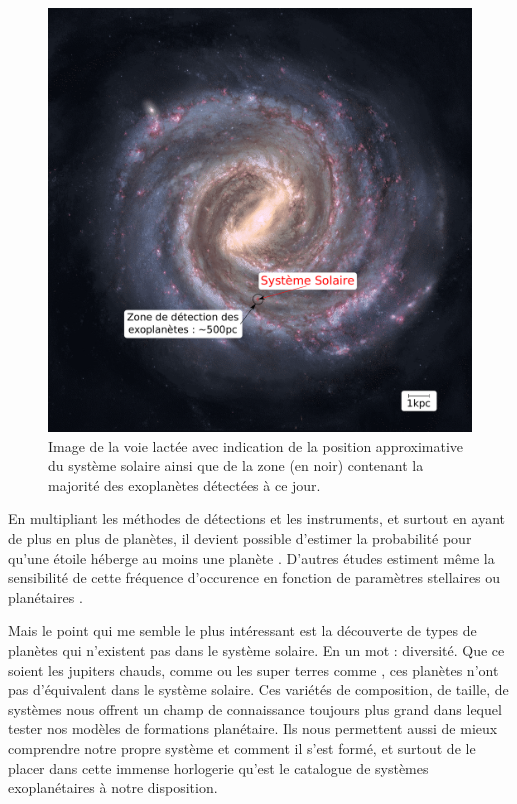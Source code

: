 \begin{figure}[htb]
\centering
\includegraphics[width=0.45\linewidth]{figure/milky_way_exoplanets.pdf}
\caption{Image de la voie lactée avec indication de la position approximative du système solaire ainsi que de la zone (en noir) contenant la majorité des exoplanètes détectées à ce jour.}\label{fig:milky_way_exoplanet}
\end{figure}


En multipliant les méthodes de détections et les instruments, et surtout en ayant de plus en plus de planètes, il devient possible d'estimer la probabilité pour qu'une étoile héberge au moins une planète \citep{mayor2011road}. D'autres études estiment même la sensibilité de cette fréquence d'occurence en fonction de paramètres stellaires \citep{fischer2005planet, johnson2007new, howard2012occurrence} ou planétaires \citep{mayor2011road, howard2010occurrence}. 

Mais le point qui me semble le plus intéressant est la découverte de types de planètes qui n'existent pas dans le système solaire. En un mot : diversité. Que ce soient les jupiters chauds, comme  ou les super terres comme , ces planètes n'ont pas d'équivalent dans le système solaire. Ces variétés de composition, de taille, de systèmes nous offrent un champ de connaissance toujours plus grand dans lequel tester nos modèles de formations planétaire. Ils nous permettent aussi de mieux comprendre notre propre système et comment il s'est formé, et surtout de le placer dans cette immense horlogerie qu'est le catalogue de systèmes exoplanétaires à notre disposition.

